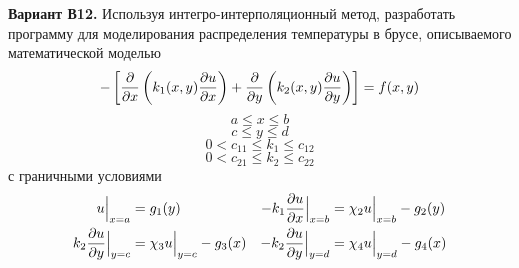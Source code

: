 \textbf{Вариант В12.} Используя интегро-интерполяционный метод,
разработать программу для моделирования распределения температуры
в брусе, описываемого математической моделью
\begin{equation}\label{main-equation}
  - \left[
    \pdv{x} \left( k_1(x, y) \pdv{u}{x} \right) +
    \pdv{y} \left( k_2(x, y) \pdv{u}{y} \right)
  \right] = f(x, y)
\end{equation}
\[ a \leq x \leq b \]
\[ c \leq y \leq d \]
\[ 0 < c_{11} \leq k_1 \leq c_{12} \]
\[ 0 < c_{21} \leq k_2 \leq c_{22} \]
с граничными условиями
\begin{align*}
  u \Big\vert_{x = a} &= g_1(y)
  &
  - k_1 \pdv{u}{x}\Big\vert_{x = b} &= \chi_2 u \Big\vert_{x = b} - g_2(y) \\
  k_2 \pdv{u}{y}\Big\vert_{y = c} &= \chi_3 u \Big\vert_{y = c} - g_3(x)
  &
  - k_2 \pdv{u}{y}\Big\vert_{y = d} &= \chi_4 u \Big\vert_{y = d} - g_4(x)
\end{align*}
